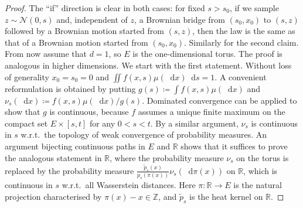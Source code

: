 \documentclass[reqno,draft]{amsart}
\numberwithin{equation}{section}
\theoremstyle{plain}
\theoremstyle{remark}
\newcommand{\R}{\mathbb{R}} %
\newcommand{\Z}{\mathbb{Z}} %
\renewcommand{\P}{\mathbb{P}} %
\newcommand*\diff{\mathop{}\!\mathrm{d}}
\newcommand{\rfy}[1]{\widetilde{{#1}}} %
\begin{document}
\begin{proof}
    The ``if'' direction is clear in both cases: for fixed $s > s_0$, if we sample $z\sim \mathcal{N}(0,s)$ and, independent of $z$, a Brownian bridge from $(s_0,x_0)$ to $(s,z)$ followed by a Brownian motion started from $(s,z)$, then the law is the same as that of a Brownian motion started from $(s_0,x_0)$. Similarly for the second claim. From now assume that $d = 1$, so $E$ is the one-dimensional torus. The proof is analogous in higher dimensions. We start with the first statement. Without loss of generality $x_0 = s_0 = 0$ and $\iint f(x,s) \mu(\diff x) \diff s = 1$. A convenient reformulation is obtained by putting $g(s) \coloneqq \int f(x,s) \mu(\diff x)$ and $\nu_s(\diff x) \coloneqq f(x,s) \mu(\diff x) / g(s)$. Dominated convergence can be applied to show that $g$ is continuous, because $f$ assumes a unique finite maximum on the compact set $E \times [s,t]$ for any $0 < s < t$. By a similar argument, $\nu_s$ is continuous in $s$ w.r.t.\ the topology of weak convergence of probability measures. An argument bijecting continuous paths in $E$ and $\R$ shows that it suffices to prove the analogous statement in $\R$, where the probability measure $\nu_s$ on the torus is replaced by the probability measure $\frac{\rfy{p}_s(x)}{p_s(\pi(x))}\nu_s(\diff \pi(x))$ on $\R$, which is continuous in $s$ w.r.t.\ all Wasserstein distances. Here $\pi\colon \R \to E$ is the natural projection characterised by $\pi(x) - x \in \Z$, and $\rfy{p}_s$ is the heat kernel on $\R$. %
    

\end{proof}
\end{document}
